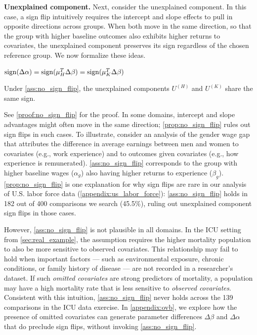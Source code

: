 \textbf{Unexplained component.} Next, consider the unexplained component. In this case, a sign flip intuitively requires the intercept and slope effects to pull in opposite directions across groups. When both move in the same direction, so that the group with higher baseline outcomes also exhibits higher returns to covariates, the unexplained component preserves its sign regardless of the chosen reference group.
We now formalize these ideas.
\begin{assumption}
\label{ass:no_sign_flip}
$
    \operatorname{sign}(\Delta\alpha) = \operatorname{sign}(\mu_H^T \Delta\beta) = \operatorname{sign}(\mu_K^T \Delta\beta)
$
\end{assumption}

\begin{proposition}
    \label{prop:no_sign_flip}
    Under \cref{ass:no_sign_flip}, the unexplained components 
    \( U^{(H)}\) and  \(U^{(K)}\) share the same sign.
\end{proposition}
See \cref{proof:no_sign_flip} for the proof.
In some domains, intercept and slope advantages might often move in the same direction; 
\cref{prop:no_sign_flip} rules out sign flips in such cases.
To illustrate, consider an analysis of the gender wage gap that attributes the difference in average earnings between men and women to covariates (e.g., work experience) and to outcomes given covariates (e.g., how experience is remunerated).
\cref{ass:no_sign_flip} corresponds to the group with higher baseline wages ($\alpha_g$) also having higher returns to experience ($\beta_g$). 
\cref{prop:no_sign_flip} is one explanation for why sign flips are rare in our analysis of U.S. labor force data (\cref{appendix:us_labor_force}): \cref{ass:no_sign_flip} holds in 182 out of 400 comparisons we search (45.5\%), ruling out unexplained component sign flips in those cases.

However, \cref{ass:no_sign_flip} is not plausible in all domains.
In the ICU setting from \cref{sec:real_example}, the assumption requires the higher mortality population to also be more sensitive to observed covariates.
This relationship may fail to hold when important factors --- such as environmental exposure, chronic conditions, or family history of disease --- are not recorded in a researcher's dataset.
If such \textit{omitted covariates} are strong predictors of mortality, a population may have a high mortality rate that is less sensitive to \textit{observed covariates}.
Consistent with this intuition, \cref{ass:no_sign_flip} never holds across the 139 comparisons in the ICU data exercise.
In \cref{appendix:ovb}, we explore how the presence of omitted covariates can generate parameter differences $\Delta\beta$ and $\Delta\alpha$ that do preclude sign flips, without invoking \cref{ass:no_sign_flip}.

